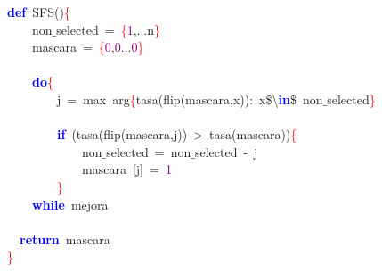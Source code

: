 \noindent
\mbox{}\textbf{\textcolor{Blue}{def}}\ SFS\textcolor{BrickRed}{()}\textcolor{Red}{\{} \\
\mbox{}\ \ \ \ non$\_$selected\ \textcolor{BrickRed}{=}\ \textcolor{Red}{\{}\textcolor{Purple}{1}\textcolor{BrickRed}{,...}n\textcolor{Red}{\}} \\
\mbox{}\ \ \ \ mascara\ \textcolor{BrickRed}{=}\ \textcolor{Red}{\{}\textcolor{Purple}{0}\textcolor{BrickRed}{,}\textcolor{Purple}{0}\textcolor{BrickRed}{...}\textcolor{Purple}{0}\textcolor{Red}{\}} \\
\mbox{} \\
\mbox{}\ \ \ \ \textbf{\textcolor{Blue}{do}}\textcolor{Red}{\{} \\
\mbox{}\ \ \ \ \ \ \ \ j\ \textcolor{BrickRed}{=}\ max\ arg\textcolor{Red}{\{}tasa\textcolor{BrickRed}{(}flip\textcolor{BrickRed}{(}mascara\textcolor{BrickRed}{,}x\textcolor{BrickRed}{)):}\ x\$\textcolor{BrickRed}{\textbackslash{}}\textbf{\textcolor{Blue}{in}}\$\ non$\_$selected\textcolor{Red}{\}} \\
\mbox{} \\
\mbox{}\ \ \ \ \ \ \ \ \textbf{\textcolor{Blue}{if}}\ \textcolor{BrickRed}{(}tasa\textcolor{BrickRed}{(}flip\textcolor{BrickRed}{(}mascara\textcolor{BrickRed}{,}j\textcolor{BrickRed}{))}\ \textcolor{BrickRed}{\textgreater{}}\ tasa\textcolor{BrickRed}{(}mascara\textcolor{BrickRed}{))}\textcolor{Red}{\{} \\
\mbox{}\ \ \ \ \ \ \ \ \ \ \ \ non$\_$selected\ \textcolor{BrickRed}{=}\ non$\_$selected\ \textcolor{BrickRed}{-}\ j \\
\mbox{}\ \ \ \ \ \ \ \ \ \ \ \ mascara\ \textcolor{BrickRed}{[}j\textcolor{BrickRed}{]}\ \textcolor{BrickRed}{=}\ \textcolor{Purple}{1} \\
\mbox{}\ \ \ \ \ \ \ \ \textcolor{Red}{\}} \\
\mbox{}\ \ \ \ \textbf{\textcolor{Blue}{while}}\ mejora \\
\mbox{} \\
\mbox{}\ \ \textbf{\textcolor{Blue}{return}}\ mascara \\
\mbox{}\textcolor{Red}{\}} \\
\mbox{}
